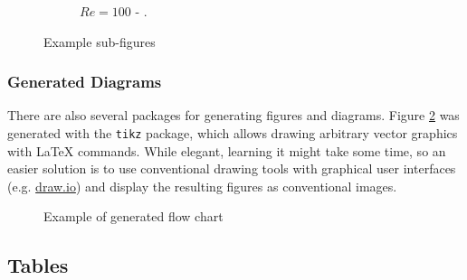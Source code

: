 \begin{figure}[H]
\begin{subfigure}[t]{0.441\textwidth}
        \caption*{$Re = 100$ - \citet{ghia_et_al}.}
    \end{subfigure}
    \caption{Example sub-figures}
    \label{fig:example-sub-figure}
\end{figure}


\subsubsection{Generated Diagrams}

There are also several packages for generating figures and diagrams.
Figure \ref{fig:example-flow-chart} was generated with the \verb|tikz| package, which allows drawing arbitrary vector graphics with LaTeX commands.
While elegant, learning it might take some time, so an easier solution is to use conventional drawing tools with graphical user interfaces (e.g. \url{draw.io}) and display the resulting figures as conventional images. 

\begin{figure}[H]
    \centering
    \caption{Example of generated flow chart}
    \label{fig:example-flow-chart}
\end{figure}


\subsection{Tables}
\label{app:tables}

